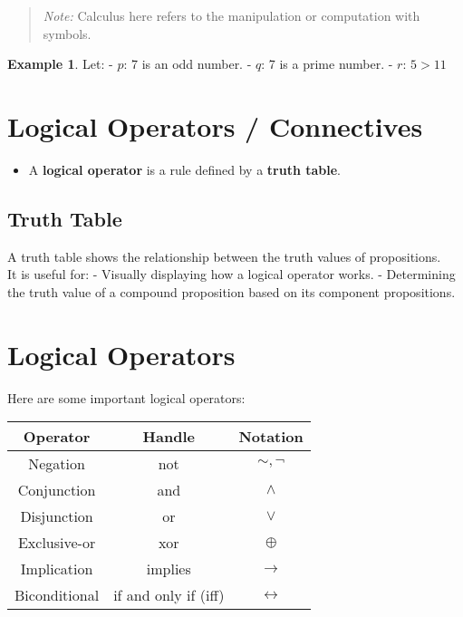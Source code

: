 \documentclass[
]{book}
\providecommand{\tightlist}{%
  \setlength{\itemsep}{0pt}\setlength{\parskip}{0pt}}
\theoremstyle{definition}
\theoremstyle{definition}
\newtheorem{example}{Example}[chapter]
\theoremstyle{definition}
\theoremstyle{definition}
\theoremstyle{remark}
\begin{document}
\begin{quote}
\emph{Note:} Calculus here refers to the manipulation or computation with symbols.
\end{quote}

\begin{example}
\protect\hypertarget{exm:unnamed-chunk-11}{}\label{exm:unnamed-chunk-11}Let:
- \(p\): 7 is an odd number.
- \(q\): 7 is a prime number.
- \(r\): \(5 > 11\)
\end{example}

\section{Logical Operators / Connectives}\label{logical-operators-connectives}

\begin{itemize}
\tightlist
\item
  A \textbf{logical operator} is a rule defined by a \textbf{truth table}.
\end{itemize}

\subsection{Truth Table}\label{truth-table}

A truth table shows the relationship between the truth values of propositions.\\
It is useful for:
- Visually displaying how a logical operator works.
- Determining the truth value of a compound proposition based on its component propositions.

\section{Logical Operators}\label{logical-operators}

Here are some important logical operators:

\begin{longtable}[]{@{}ccc@{}}
\toprule\noalign{}
\textbf{Operator} & \textbf{Handle} & \textbf{Notation} \\
\midrule\noalign{}
\endhead
\bottomrule\noalign{}
\endlastfoot
Negation & not & \(\sim ,\neg\) \\
Conjunction & and & \(\land\) \\
Disjunction & or & \(\lor\) \\
Exclusive-or & xor & \(\oplus\) \\
Implication & implies & \(\rightarrow\) \\
Biconditional & if and only if (iff) & \(\leftrightarrow\) \\
\end{longtable}
\end{document}
